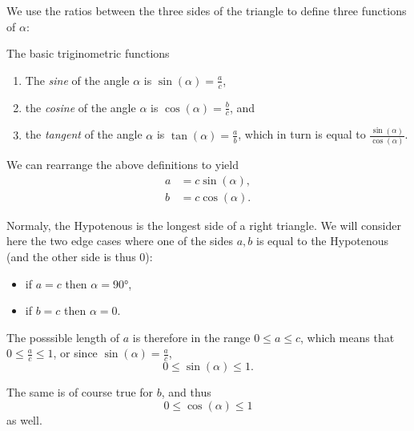 We use the ratios between the three sides of the triangle to define three functions of $\alpha$:
\begin{definition}{The basic triginometric functions}{}
	\vspace{5mm}
	\begin{enumerate}
		\item The \emph{sine} of the angle $\alpha$ is $\sin(\alpha)=\frac{a}{c}$,
		\item the \emph{cosine} of the angle $\alpha$ is $\cos(\alpha)=\frac{b}{c}$, and
		\item the \emph{tangent} of the angle $\alpha$ is $\tan(\alpha)=\frac{a}{b}$, which in turn is equal to $\frac{\sin(\alpha)}{\cos(\alpha)}$.
		\end{enumerate}
	\label{def:basic_trig}
\end{definition}

We can rearrange the above definitions to yield
\begin{align}
	a &= c\sin(\alpha),\nonumber\\
	b &= c\cos(\alpha).
	\label{eq:basic_trig_rearrange}
\end{align}

Normaly, the Hypotenous is the longest side of a right triangle. We will consider here the two edge cases where one of the sides $a,b$ is equal to the Hypotenous (and the other side is thus $0$):
\begin{itemize}
	\item if $a=c$ then $\alpha=\ang{90}$,\
	\item if $b=c$ then $\alpha=0$.
\end{itemize}

The posssible length of $a$ is therefore in the range $0\leq a \leq c$, which means that $0\leq \frac{a}{c} \leq 1$, or since $\sin(\alpha)=\frac{a}{c}$,
\begin{equation}
	0\leq \sin(\alpha) \leq1.
	\label{eq:img_sin}
\end{equation}

The same is of course true for $b$, and thus
\begin{equation}
	0\leq \cos(\alpha) \leq1
	\label{eq:img_cos}
\end{equation}
as well.

